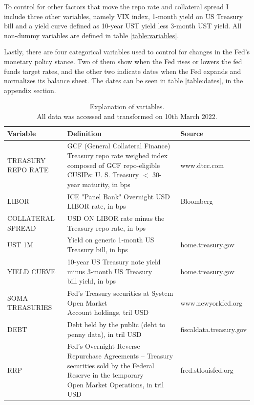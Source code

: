 \documentclass[11pt,a4paper,english,oneside]{article}
\begin{document}
To control for other factors that move the repo rate and collateral spread I include three other variables, namely VIX index, 1-month yield on US Treasury bill and a yield curve defined as 10-year UST yield less 3-month UST yield. All non-dummy variables are defined in table \ref{table:variables}.

Lastly, there are four categorical variables used to control for changes in the Fed's monetary policy stance. Two of them show when the Fed rises or lowers the fed funds target rates, and the other two indicate dates when the Fed expands and normalizes its balance sheet. The dates can be seen in table \ref{table:dates}, in the appendix section.

\begin{table} \centering
\caption{Explanation of variables.\\
  All data was accessed and transformed on 10th March 2022.}
{\renewcommand{\arraystretch}{2.2} 
\begin{tabular}{lll}
\toprule
  \textbf{Variable} & \textbf{Definition} & \textbf{Source} \\
\midrule
  TREASURY REPO RATE &  \makecell[l]{GCF (General Collateral Finance) Treasury repo rate\\weighed index composed of GCF repo-eligible CUSIPs:\\U. S. Treasury $<$ 30-year maturity, in bps} & www.dtcc.com\\
\hline
  LIBOR & ICE "Panel Bank" Overnight USD LIBOR rate, in bps & Bloomberg\\
\hline
  COLLATERAL SPREAD & USD ON LIBOR rate minus the Treasury repo rate, in bps & \\
\hline
  UST 1M & Yield on generic 1-month US Treasury bill, in bps & home.treasury.gov\\
\hline
  YIELD CURVE & \makecell[l]{10-year US Treasury note yield  minus 3-month US Treasury\\bill yield, in bps} & home.treasury.gov\\
\hline
  SOMA TREASURIES & \makecell[l]{Fed's Treasury securities at System Open Market\\Account holdings, tril USD} & www.newyorkfed.org\\
\hline
  DEBT & Debt held by the public (debt to penny data), in tril USD & fiscaldata.treasury.gov\\
\hline
  RRP & \makecell[l]{Fed's Overnight Reverse Repurchase Agreements -- Treasury\\securities sold by the Federal Reserve in the temporary\\Open Market Operations, in tril USD} & fred.stlouisfed.org\\

\end{tabular}}
\end{table}
\end{document}
